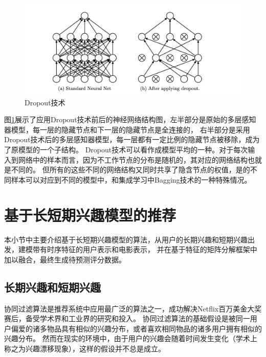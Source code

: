 \begin{figure}[htbp]
\centering
\includegraphics[scale=0.5]{images/dropout.png}
\caption{Dropout技术}
\label{fig:dropout}
\end{figure}

图\ref{fig:dropout}展示了应用Dropout技术前后的神经网络结构图，左半部分是原始的多层感知器模型，每一层的隐藏节点和下一层的隐藏节点是全连接的，
右半部分是采用Dropout技术后的多层感知器模型，每一层都有一定比例的隐藏节点被移除，成为了原模型的一个子结构。
Dropout技术可以看作成模型平均的一种。对于每次输入到网络中的样本而言，因为不工作节点的分布是随机的，其对应的网络结构也就是不同的。
但所有的这些不同的网络结构又同时共享了隐含节点的权值，是的不同样本可以对应到不同的模型中，和集成学习中Bagging技术的一种特殊情况。

\section{基于长短期兴趣模型的推荐}
本小节中主要介绍基于长短期兴趣模型的算法，从用户的长期兴趣和短期兴趣出发，建模带有时序特征的用户表示和电影表示，
并在基于特征的矩阵分解框架中加以融合，最终生成待预测评分数据。

\subsection{长期兴趣和短期兴趣}
协同过滤算法是推荐系统中应用最广泛的算法之一，成功解决Netflix百万美金大奖赛后，备受学术界和工业界的研究和投入。
协同过滤算法的基础假设是被同一用户偏爱的诸多物品具有相似的兴趣分布，或者喜欢相同物品的诸多用户拥有相似的兴趣分布。
然而在现实的环境中，由于用户的兴趣会随着时间发生变化（学术上称之为兴趣漂移现象），这样的假设并不总是成立。

